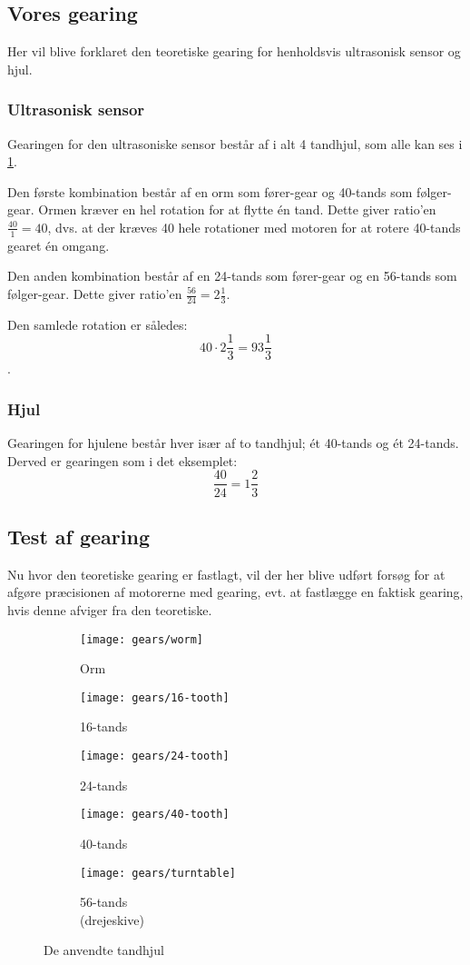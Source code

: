 \subsection{Vores gearing}
Her vil blive forklaret den teoretiske gearing for henholdsvis ultrasonisk sensor og hjul.

\subsubsection{Ultrasonisk sensor}
Gearingen for den ultrasoniske sensor består af i alt 4 tandhjul, som alle kan ses i \cref{gearing:tandhjul}.

Den første kombination består af en orm som fører-gear og 40-tands som følger-gear.
Ormen kræver en hel rotation for at flytte én tand.
Dette giver ratio'en $\frac{40}{1} = 40$, dvs. at der kræves 40 hele rotationer med motoren for at rotere 40-tands gearet én omgang.

Den anden kombination består af en 24-tands som fører-gear og en 56-tands som følger-gear.
Dette giver ratio'en $\frac{56}{24} = 2 \frac{1}{3}$.

Den samlede rotation er således: $$40 \cdot 2\frac{1}{3} = 93 \frac{1}{3}$$.

\subsubsection{Hjul}
Gearingen for hjulene består hver især af to tandhjul; ét 40-tands og ét 24-tands.
Derved er gearingen som i det eksemplet: $$ \frac{40}{24} = 1 \frac{2}{3} $$

\subsection{Test af gearing}
Nu hvor den teoretiske gearing er fastlagt, vil der her blive udført forsøg for at afgøre præcisionen af motorerne med gearing, evt. at fastlægge en faktisk gearing, hvis denne afviger fra den teoretiske.

\begin{figure}[h]
\centering
\begin{subfigure}[b]{.19\textwidth}
\centering
\texttt{[image: gears/worm]}
\caption{Orm}
\end{subfigure}
\begin{subfigure}[b]{.19\textwidth}
\centering
\texttt{[image: gears/16-tooth]}
\caption{16-tands}
\end{subfigure}
\begin{subfigure}[b]{.19\textwidth}
\centering
\texttt{[image: gears/24-tooth]}
\caption{24-tands}
\end{subfigure}
\begin{subfigure}[b]{.19\textwidth}
\centering
\texttt{[image: gears/40-tooth]}
\caption{40-tands}
\end{subfigure}
\begin{subfigure}[b]{.19\textwidth}
\centering
\texttt{[image: gears/turntable]}
\caption{56-tands \\ \centering (drejeskive)}
\end{subfigure}
\caption{De anvendte tandhjul}
\label{gearing:tandhjul}
\end{figure}